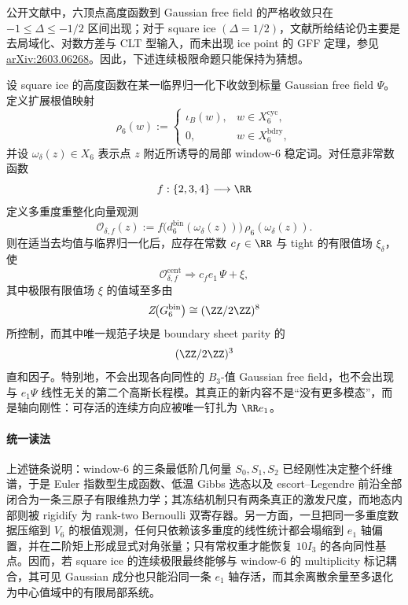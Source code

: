 \noindent
公开文献中，六顶点高度函数到 Gaussian free field 的严格收敛只在 \(-1\le \Delta\le -1/2\) 区间出现；对于 square ice \((\Delta=1/2)\)，文献所给结论仍主要是去局域化、对数方差与 CLT 型输入，而未出现 ice point 的 GFF 定理，参见 \href{https://arxiv.org/abs/2603.06268}{arXiv:2603.06268}。因此，下述连续极限命题只能保持为猜想。

\begin{conjecture}\label{conj:conclusion-window6-icepoint-axial-local-system}
设 square ice 的高度函数在某一临界归一化下收敛到标量 Gaussian free field \(\Psi\)。定义扩展根值映射
\[
\rho_6(w):=
\begin{cases}
\iota_B(w),& w\in X_6^{\mathrm{cyc}},\\
0,& w\in X_6^{\mathrm{bdry}},
\end{cases}
\]
并设 \(\omega_\delta(z)\in X_6\) 表示点 \(z\) 附近所诱导的局部 window-\(6\) 稳定词。对任意非常数函数
\[
f:\{2,3,4\}\longrightarrow \RR
\]
定义多重度重整化向量观测
\[
\mathcal O_{\delta,f}(z)
:=
f\!\bigl(d_6^{\mathrm{bin}}(\omega_\delta(z))\bigr)\,
\rho_6(\omega_\delta(z)).
\]
则在适当去均值与临界归一化后，应存在常数 \(c_f\in\RR\) 与 tight 的有限值场 \(\xi_\delta\)，使
\[
\mathcal O_{\delta,f}^{\mathrm{cent}}
\Longrightarrow
c_f e_1\,\Psi+\xi,
\]
其中极限有限值场 \(\xi\) 的值域至多由
\[
Z\!\bigl(G_6^{\mathrm{bin}}\bigr)\cong (\ZZ/2\ZZ)^8
\]
所控制，而其中唯一规范子块是 boundary sheet parity 的
\[
(\ZZ/2\ZZ)^3
\]
直和因子。特别地，不会出现各向同性的 \(B_3\)-值 Gaussian free field，也不会出现与 \(e_1\Psi\) 线性无关的第二个高斯长程模。其真正的新内容不是“没有更多模态”，而是轴向刚性：可存活的连续方向应被唯一钉扎为 \(\RR e_1\)。
\end{conjecture}

\paragraph{统一读法}
上述链条说明：window-\(6\) 的三条最低阶几何量 \(S_0,S_1,S_2\) 已经刚性决定整个纤维谱，于是 Euler 指数型生成函数、低温 Gibbs 选态以及 escort--Legendre 前沿全部闭合为一条三原子有限维热力学；其冻结机制只有两条真正的激发尺度，而地态内部则被 rigidify 为 rank-two Bernoulli 双寄存器。另一方面，一旦把同一多重度数据压缩到 \(V_6\) 的根值观测，任何只依赖该多重度的线性统计都会塌缩到 \(e_1\) 轴偏置，并在二阶矩上形成显式对角张量；只有常权重才能恢复 \(10I_3\) 的各向同性基点。因而，若 square ice 的连续极限最终能够与 window-\(6\) 的 multiplicity 标记耦合，其可见 Gaussian 成分也只能沿同一条 \(e_1\) 轴存活，而其余离散余量至多退化为中心值域中的有限局部系统。

\endinput
